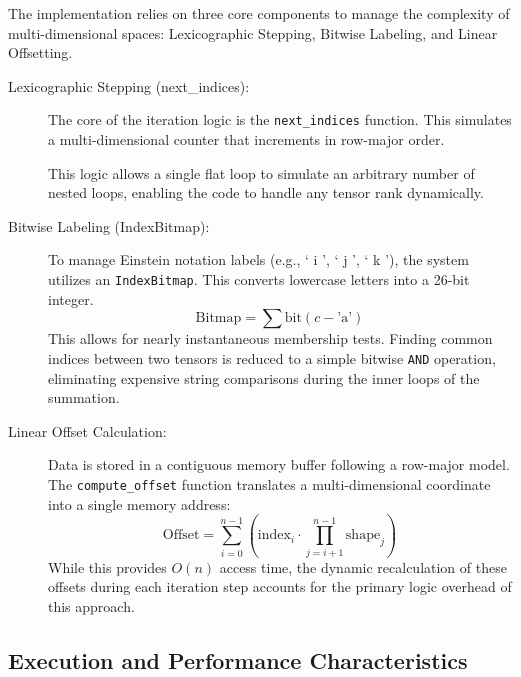 \documentclass[binding=0.6cm]{sapthesis}
\begin{document}
The implementation relies on three core components to manage the complexity of multi-dimensional spaces: Lexicographic Stepping, Bitwise Labeling, and Linear Offsetting.

\begin{description}
	\item [Lexicographic Stepping (next\_indices):] The core of the iteration logic is the \texttt{next\_indices} function. This simulates a multi-dimensional counter that increments in row-major order.
	      This logic allows a single flat loop to simulate an arbitrary number of nested loops, enabling the code to handle any tensor rank dynamically.

	\item [Bitwise Labeling (IndexBitmap):] To manage Einstein notation labels (e.g., ` i ', ` j ', ` k '), the system utilizes an \texttt{IndexBitmap}. This converts lowercase letters into a 26-bit integer.
	      \[ \text{Bitmap} = \sum \text{bit}(c - \text{'a'}) \]
	      This allows for nearly instantaneous membership tests. Finding common indices between two tensors is reduced to a simple bitwise \texttt{AND} operation, eliminating expensive string comparisons during the inner loops of the summation.

	\item [Linear Offset Calculation:] Data is stored in a contiguous memory buffer following a row-major model. The \texttt{compute\_offset} function translates a multi-dimensional coordinate into a single memory address:
	      \[ \text{Offset} = \sum_{i=0}^{n-1} \left( \text{index}_i \cdot \prod_{j=i+1}^{n-1} \text{shape}_j \right) \]
	      While this provides $O(n)$ access time, the dynamic recalculation of these offsets during each iteration step accounts for the primary logic overhead of this approach.
\end{description}

\subsection{Execution and Performance Characteristics}
\end{document}
